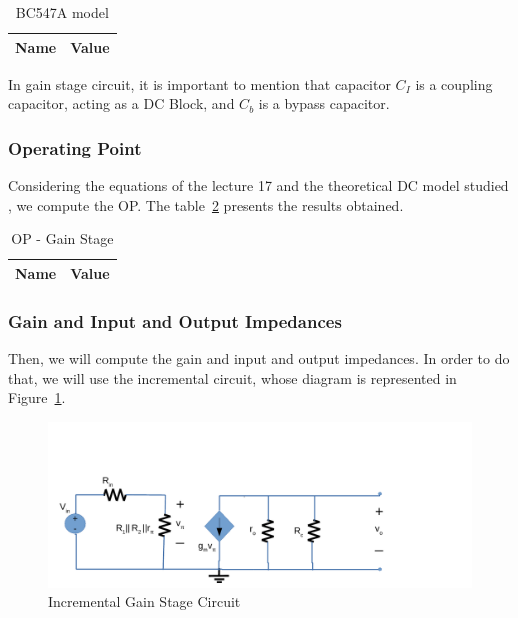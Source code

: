 \begin{table}[H]
  \centering
  \begin{tabular}{|l|r|}
     \hline    
    {\bf Name} & {\bf Value} \\ \hline   
    
  \end{tabular}
  \caption{BC547A model}
  \label{tab:bgs}
\end{table}

In gain stage circuit, it is important to mention that capacitor $C_I$ is a coupling capacitor, acting as a DC Block, and $C_b$ is a bypass capacitor.

\subsubsection{Operating Point}
Considering the equations of the lecture 17 and the theoretical DC model studied , we compute the OP. The table~\ref{tab:opgs} presents the results obtained.

\begin{table}[H]
  \centering
  \begin{tabular}{|l|r|}
     \hline    
    {\bf Name} & {\bf Value} \\ \hline   
    
  \end{tabular}
  \caption{OP - Gain Stage}
  \label{tab:opgs}
\end{table}

\subsubsection{Gain and Input and Output Impedances}
Then, we will compute the gain and input and output impedances. In order to do that, we will  use the incremental circuit, whose diagram is represented in Figure~\ref{fig:gsincrem}.

\begin{figure}[H] \centering
\includegraphics[width=0.8\linewidth]{incrementalgs.pdf}
\caption{Incremental Gain Stage Circuit}                         %
\label{fig:gsincrem}
\end{figure}

